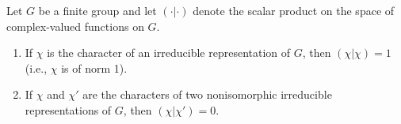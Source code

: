 Let $G$ be a finite group and let $(\cdot|\cdot)$ denote the scalar product on the space of complex-valued functions on $G$.

\begin{enumerate}
\item[(i)] If $\chi$ is the character of an irreducible representation of $G$, then $(\chi|\chi) = 1$ (i.e., $\chi$ is of norm 1).
\item[(ii)] If $\chi$ and $\chi'$ are the characters of two nonisomorphic irreducible representations of $G$, then $(\chi|\chi') = 0$.
\end{enumerate}